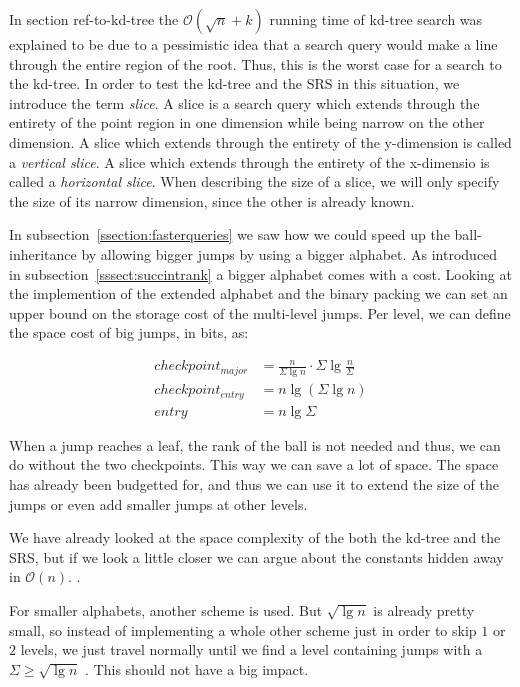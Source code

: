 In section ref-to-kd-tree the $\mathcal{O}(\sqrt{n}+k)$ running time of kd-tree search was explained to be due to a pessimistic idea that a search query would make a line through the entire region of the root. Thus, this is the worst case for a search to the kd-tree. In order to test the kd-tree and the SRS in this situation, we introduce the term \emph{slice}. A slice is a search query which extends through the entirety of the point region  in one dimension while being narrow on the other dimension. A slice which extends through the entirety of the y-dimension is called a \emph{vertical slice}. A slice which extends through the entirety of the x-dimensio is called a \emph{horizontal slice}. When describing the size of a slice, we will only specify the size of its narrow dimension, since the other is already known.

In subsection~\ref{ssection:fasterqueries} we saw how we could speed up the ball-inheritance by allowing bigger jumps by using a bigger alphabet. As introduced in subsection~\ref{sssect:succintrank} a bigger alphabet comes with a cost. Looking at the implemention of the extended alphabet and the binary packing we can set an upper bound on the storage cost of the multi-level jumps. Per level, we can define the space cost of big jumps, in bits, as:

\begin{align*}
  checkpoint_{major} &= \frac{n}{\Sigma \lg n} \cdot \Sigma \lg \frac{n}{\Sigma} \\
  checkpoint_{entry} &= n \lg (\Sigma \lg n) \\
  entry &= n \lg \Sigma
\end{align*}

When a jump reaches a leaf, the rank of the ball is not needed and thus, we can do without the two checkpoints. This way we can save a lot of space. The space has already been budgetted for, and thus we can use it to extend the size of the jumps or even add smaller jumps at other levels.

We have already looked at the space complexity of the both the kd-tree and the SRS, but if we look a little closer we can argue about the constants hidden away in $\mathcal{O}(n)$. .


 For smaller alphabets, another scheme is used. But $\sqrt{\lg n}$ is already pretty small, so instead of implementing a whole other scheme just in order to skip $1$ or $2$ levels, we just travel normally until we find a level containing jumps with a $\Sigma \geq \sqrt{\lg n}$ . This should not have a big impact. 


